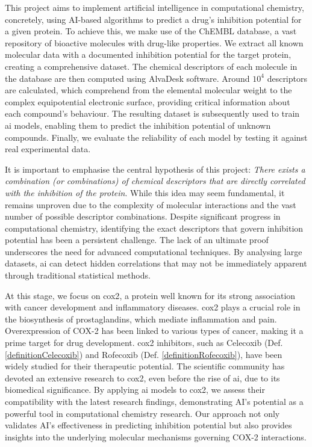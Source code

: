 \documentclass[11pt]{article}
\begin{document}
This project aims to implement artificial intelligence in computational chemistry, concretely, using AI-based algorithms to predict a drug’s inhibition potential\cite{BookIC50} for a given protein. To achieve this, we make use of the ChEMBL database\cite{ChemblDatabase}, a vast repository of bioactive molecules with drug-like properties. We extract all known molecular data with a documented inhibition potential for the target protein, creating a comprehensive dataset. The chemical descriptors of each molecule in the database are then computed using AlvaDesk\cite{MauriMolecularDescriptorsBook}\cite{AlvaDescSecondPaper} software. Around $10^4$ descriptors are calculated\cite{DescriptorsBookClassification}, which comprehend from the elemental molecular weight to the complex equipotential electronic surface, providing critical information about each compound’s behaviour. The resulting dataset is subsequently used to train \gls{ai} models, enabling them to predict the inhibition potential of unknown compounds. Finally, we evaluate the reliability of each model by testing it against real experimental data. \par

It is important to emphasise the central hypothesis of this project: \emph{There exists a combination (or combinations) of chemical descriptors that are directly correlated with the inhibition of the protein}. While this idea may seem fundamental, it remains unproven due to the complexity of molecular interactions and the vast number of possible descriptor combinations. Despite significant progress in computational chemistry, identifying the exact descriptors that govern inhibition potential has been a persistent challenge. The lack of an ultimate proof underscores the need for advanced computational techniques. By analysing large datasets, \gls{ai} can detect hidden correlations that may not be immediately apparent through traditional statistical methods.\par

At this stage, we focus on \gls{cox2}, a protein well known for its strong association with cancer development and inflammatory diseases\cite{DefinitionCOX2CancerDictionary}. \gls{cox2} plays a crucial role in the biosynthesis of prostaglandins, which mediate inflammation and pain. Overexpression of COX-2 has been linked to various types of cancer, making it a prime target for drug development. \gls{cox2} inhibitors, such as Celecoxib (Def. \ref{definitionCelecoxib}) and Rofecoxib (Def. \ref{definitionRofecoxib}), have been widely studied for their therapeutic potential. The scientific community has devoted an extensive research to \gls{cox2}, even before the rise of \gls{ai}, due to its biomedical significance\cite{Cox2InhibitorsReview}. By applying \gls{ai} models to \gls{cox2}, we assess their compatibility with the latest research findings, demonstrating AI’s potential as a powerful tool in computational chemistry research. Our approach not only validates AI’s effectiveness in predicting inhibition potential but also provides insights into the underlying molecular mechanisms governing COX-2 interactions.\par
\end{document}
